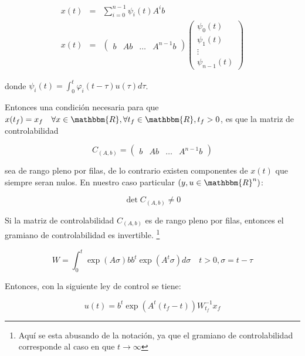         \begin{eqnarray}
        x(t) & = & \sum\limits_{i=0}^{n-1} \psi_i(t) A^i b \nonumber \\
        x(t) & = &
        \begin{pmatrix}
        b & A b & \dots & A^{n-1} b
        \end{pmatrix}
        \begin{pmatrix}
        \psi_0(t) \\
        \psi_1(t) \\
        \vdots \\
        \psi_{n-1}(t)
        \end{pmatrix}
        \end{eqnarray}

        donde $\psi_i(t) = \int_0^t \varphi_i (t - \tau) u(\tau) d \tau$.

        Entonces una condición necesaria para que $x(t_f) = x_f \quad \forall x \in \mathbbm{R}, \forall t_f \in \mathbbm{R}, t_f > 0$, es que la matriz de controlabilidad

        \begin{equation}
            C_{(A,b)} =
            \begin{pmatrix}
            b & Ab & \dots & A^{n-1}b
            \end{pmatrix}
        \end{equation}

        sea de rango pleno por filas, de lo contrario existen componentes de $x(t)$ que siempre seran nulos. En nuestro caso particular $\left( y, u \in \mathbbm{R}^n \right)$:

        \begin{equation}
            \det{C_{(A,b)}} \ne 0
        \end{equation}

        Si la matriz de controlabilidad $C_{(A,b)}$ es de rango pleno por filas, entonces el gramiano de controlabilidad es invertible. \footnote{Aquí se esta abusando de la notación, ya que el gramiano de controlabilidad corresponde al caso en que $t \to \infty$}

        \begin{equation}
            W = \int_0^t \exp{(A \sigma)} b b^t \exp{(A^t \sigma)} d\sigma \quad t > 0, \sigma = t - \tau
        \end{equation}

        Entonces, con la siguiente ley de control se tiene:

        \begin{equation}
            u(t) = b^t \exp{(A^t(t_f - t))} W_{t_f}^{-1} x_f
        \end{equation}

